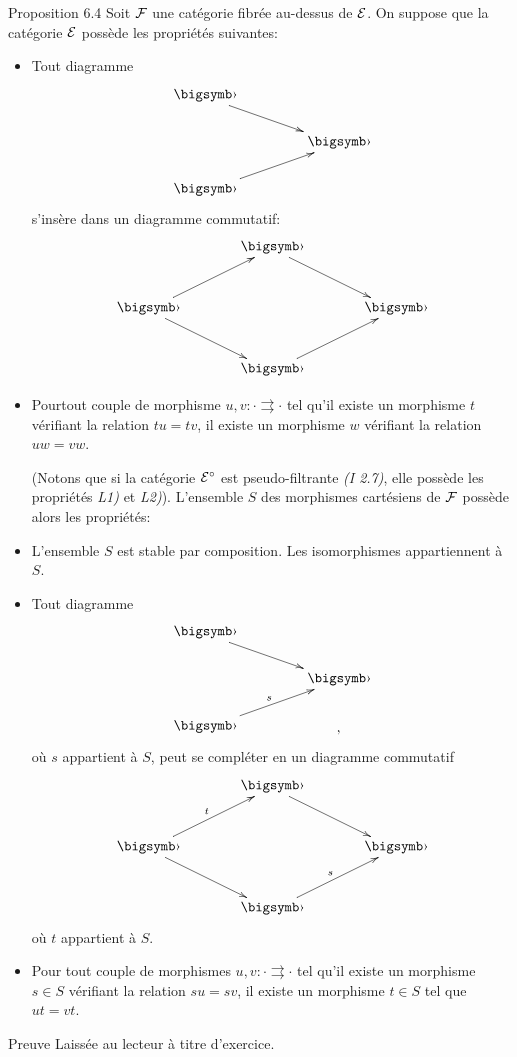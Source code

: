 \documentclass[10pt]{../fichiers-configuration-latex/smfart}
\begin{document}
\begin{enonce*}{Proposition 6.4}
Soit ${\mathcal F}$ une catégorie fibrée au-dessus de ${\mathcal E}$. On
suppose que la catégorie ${\mathcal E}$ possède les propriétés
suivantes:
\begin{itemize}
\item[L1)] Tout diagramme
\[
\xymatrix@C=1.5cm@R=.65cm{
\bigdot \ar[rd]& \\
        & \bigdot\\
\bigdot \ar[ru]&
}
\]
s'insère dans un diagramme commutatif:
\[
\xymatrix@C=1.25cm@R=1cm{
        & \bigdot \ar[rd]&\\
\bigdot \ar[ru]\ar[rd]&         & \bigdot\\
        & \bigdot \ar[ru]&
}
\]

\item [L2)] Pour\pageoriginale tout couple de morphisme $u, v : \cdot
  \rightrightarrows \cdot$ tel qu'il existe un morphisme $t$ vérifiant
  la relation $tu = tv$, il existe un morphisme $w$ vérifiant la
  relation $uw = vw$.

(Notons que si la catégorie ${\mathcal E}^{\circ}$ est pseudo-filtrante
\emph{(I 2.7)}, elle possède les propriétés \emph{L1)} et
\emph{L2)}). L'ensemble $S$ des
morphismes cartésiens de ${\mathcal F}$ possède alors les propriétés:

\item[Fr1)] L'ensemble $S$ est stable par composition. Les
  isomorphismes appartiennent à~$S$.

\item[Fr2)] Tout diagramme
\[
\xymatrix@C=1.5cm@R=.65cm{
\bigdot \ar[rd]& \\
        & \bigdot\\
\bigdot \ar[ru]^{s}&,
}
\]
où $s$ appartient à $S$, peut se compléter en un diagramme commutatif
\[
\xymatrix@C=1.25cm@R=1cm{
        & \bigdot \ar[rd]&\\
\bigdot \ar[ru]^{t}\ar[rd]&         & \bigdot\\
        & \bigdot \ar[ru]^{s}&
}
\]
où $t$ appartient à $S$.

\item[Fr3)] Pour tout couple de morphismes $u, v : \cdot
  \rightrightarrows \cdot$ tel qu'il existe un morphisme $s \in S$
  vérifiant la relation $su = sv$, il existe un morphisme $t \in S$
  tel que $ut = vt$.
\end{itemize}
\end{enonce*}

\begin{enonce*}[remark]{Preuve}
Laissée au lecteur à titre d'exercice.
\end{enonce*}
\end{document}
